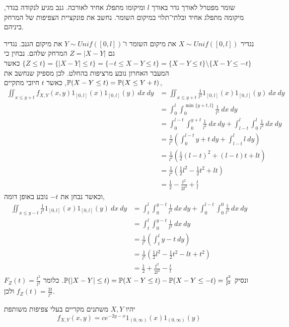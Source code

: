 \question{}
שומר מפטרל לאורך גדר באורך $l$ ומיקומו מתפלג אחיד לאורכה.
גנב מגיע לנקודה בגדר, מיקומה מתפלג אחיד ובלתי־תלוי במיקום השומר.
נחשב את פונקציית הצפיפות של המרחק ביניהם.
\begin{solution}
	נגדיר $X \sim Unif([0, l])$ את מיקום השומר ו־$Y \sim Unif([0, l])$ את מיקום הגנב.
	נגדיר גם $Z = |X - Y|$ המרחק שלהם.
	נבחין כי $\{ Z \le t \} = \{ |X - Y| \le t \} = \{ -t \le X - Y \le t \} = \{X - Y \le t\} \setminus \{X - Y \le -t\}$ כאשר המעבר האחרון נובע מרציפות בהחלט.
	לכן מספיק שנחשב את $\mathbb{P}(X - Y \le t) = \mathbb{P}(X \le Y + t)$,
	כאשר $t$ חיובי מתקיים,
	\begin{align*}
		\iint_{x \le y + t} f_{X, Y}(x, y) 1_{[0, l]}(x) 1_{[0, l]}(y) \ dx\ dy
		& = \iint_{x \le y + t} \frac{1}{l^2} 1_{[0, l]}(x) 1_{[0, l]}(y) \ dx\ dy \\
		& = \int_0^l \int_0^{\min\{y + t, l\}} \frac{1}{l^2} \ dx\ dy \\
		& = \int_0^{l - t} \int_0^{y + t} \frac{1}{l^2} \ dx\ dy + \int_{l - t}^l \int_0^{l} \frac{1}{l^2} \ dx\ dy \\
		& = \frac{1}{l^2} \left( \int_0^{l - t} y + t\ dy + \int_{l - t}^l l\ dy \right) \\
		& = \frac{1}{l^2} \left(\frac{1}{2} {(l - t)}^2 + (l - t) t + l t \right) \\
		& = \frac{1}{l^2} (\frac{1}{2} l^2 - \frac{1}{2} t^2 + lt) \\
		& = \frac{1}{2} - \frac{t^2}{2l^2} + \frac{t}{l}
	\end{align*}
	וכאשר נבחן את $-t$ נובע באופן דומה,
	\begin{align*}
		\iint_{x \le y - t} \frac{1}{l^2} 1_{[0, l]}(x) 1_{[0, l]}(y) \ dx\ dy
		& = \int_t^{l} \int_0^{y - t} \frac{1}{l^2} \ dx\ dy + \int_{0}^{l - t} \int_0^{0} \frac{1}{l^2} \ dx\ dy \\
		& = \int_t^{l} \int_0^{y - t} \frac{1}{l^2} \ dx\ dy \\
		& = \frac{1}{l^2} \left( \int_t^{l} y - t\ dy \right) \\
		& = \frac{1}{l^2} \left(\frac{1}{2} l^2 - \frac{1}{2} t^2 - l t + t^2 \right) \\
		& = \frac{1}{2} + \frac{t^2}{2 l^2} - \frac{t}{l}
	\end{align*}
	ונסיק $\mathbb{P}(|X - Y| \le t) = \mathbb{P}(X - Y \le t) - \mathbb{P}(X - Y \le -t) = \frac{t^2}{l^2}$.
	כלומר $F_Z(t) = \frac{t^2}{l^2}$ ולכן $f_Z(t) = \frac{2t}{l^2}$.
\end{solution}

\question{}
יהיו $X, Y$ משתנים מקריים בעלי צפיפות משותפת
\[
	f_{X, Y}(x, y)
	= c e^{-2y - x} 1_{(0, \infty)}(x) 1_{(0, \infty)}(y)
\]

